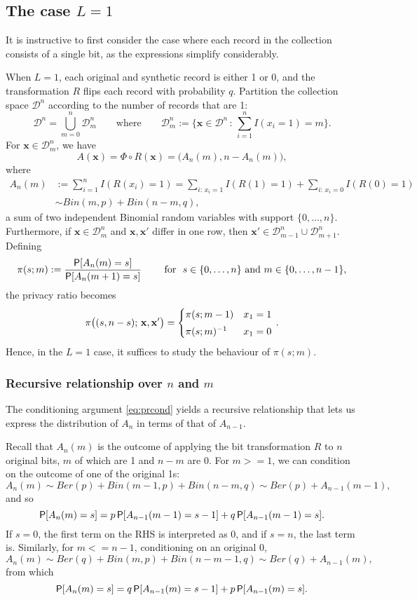 \documentclass[11pt,draft]{article}
\newcommand{\Dsp}{\mathcal{D}}
\newcommand{\xv}{\mathbf{x}}
\begin{document}
\subsection{The case $L = 1$}

It is instructive to first consider the case where each record in the collection consists of a single bit, as the expressions simplify considerably.

When $L=1$, each original and synthetic record is either 1 or 0, and the transformation $R$ flips each record with probability $q$.
Partition the collection space $\Dsp^n$ according to the number of records that are 1:
\[ \Dsp^n = \bigcup_{m = 0}^n \Dsp_m^n
\quad\quad\text{where}\quad\quad
\Dsp_m^n := \bigg\{ \xv\in\Dsp^n \,:\, \sum_{i=1}^n I(x_i = 1) = m \bigg\}.
\]
For $\xv\in\Dsp_m^n$, we have
\[ A(\xv) = \Phi\circ R(\xv) = \big(A_n(m), n - A_n(m)\big), \]
where
\begin{align*}
A_n(m) &:= \sum_{i=1}^n I(R(x_i) = 1)
= \sum_{i:\, x_i = 1} I(R(1) = 1) + \sum_{i:\, x_i = 0} I(R(0) = 1) \\
&\sim Bin(m, p) + Bin(n-m, q),
\end{align*}
a sum of two independent Binomial random variables with support $\{0,\dots,n\}$.
Furthermore, if $\xv\in\Dsp_m^n$ and $\xv,\xv'$ differ in one row, then $\xv'\in\Dsp_{m-1}^n \cup \Dsp_{m+1}^n$.
Defining
\[ \pi(s; m) := \frac{\P[A_n(m) = s]}{\P[A_n(m+1) = s]}\
\quad\quad\text{for}\ \ 
s\in\{0,\dots,n\}\ \text{and}\ m\in\{0,\dots,n-1\},
\]
the privacy ratio becomes
\[ \pi\big((s, n-s);\,\xv,\xv'\big) =
\begin{cases}
\pi(s;m - 1) & x_1 = 1 \\[0.3em]
\inv{\pi(s;m)} & x_1 = 0
\end{cases}\, .
\]
Hence, in the $L=1$ case, it suffices to study the behaviour of $\pi(s;m)$.


\subsubsection{Recursive relationship over $n$ and $m$}

The conditioning argument \eqref{eq:prcond} yields a recursive relationship that lets us express the distribution of $A_n$ in terms of that of $A_{n-1}$.

Recall that $A_n(m)$ is the outcome of applying the bit transformation $R$ to $n$ original bits, $m$ of which are 1 and $n-m$ are 0.
For $m >= 1$, we can condition on the outcome of one of the original 1s:
\[ A_n(m) \sim Ber(p) + Bin(m-1, p) + Bin(n-m, q) \sim Ber(p) + A_{n-1}(m-1), \]
and so
\begin{equation}\label{eq:rec1}
\P[A_n(m) = s] = p\P[A_{n-1}(m-1) = s-1] + q\P[A_{n-1}(m-1) = s].
\end{equation}
If $s = 0$, the first term on the RHS is interpreted as 0, and if $s = n$, the last term is.
Similarly, for $m <= n-1$, conditioning on an original 0,
\[ A_n(m) \sim Ber(q) + Bin(m, p) + Bin(n-m-1, q) \sim Ber(q) + A_{n-1}(m), \]
from which
\begin{equation}\label{eq:rec0}
\P[A_n(m) = s] = q\P[A_{n-1}(m) = s-1] + p\P[A_{n-1}(m) = s].
\end{equation}
\end{document}

